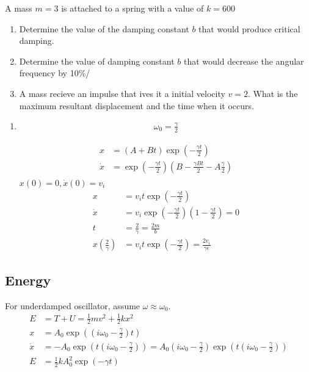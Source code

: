 \documentclass[a4paper]{article}
\numberwithin{equation}{section}
\begin{document}
\begin{example}
    A mass $m=3$ is attached to a spring with a value of $k=600$
    \begin{enumerate}
        \item Determine the value of the damping constant $b$ that would produce critical damping.
        \item Determine the value of damping constant $b$ that would decrease the angular frequency by 10\%/
        \item A mass recieve an impulse that ives it a initial velocity $v=2$. What is the maximum resultant displacement and the time when it occurs.
    \end{enumerate}
\end{example}
\begin{sol}
    \begin{enumerate}
        \item \begin{align}
            \omega_0=\frac{\gamma}{2}
        \end{align}

        \begin{align}
            x &= (A+Bt)\exp(-\frac{\gamma t}{2})\\
            \dot x&= \exp(-\frac{\gamma t}{2})\left(B-\frac{\gamma Bt}{2}-A\frac{\gamma}{2}\right)\\
        \end{align}
        $x(0)=0, \dot x(0)=v_i$
        \begin{align}
            x &=v_i t\exp(-\frac{\gamma t}{2})\\
            \dot x &= v_i\exp(-\frac{\gamma t}{2})\left(1-\frac{\gamma t}{2}\right) = 0\\
            t &= \frac{2}{\gamma}=\frac{2m}{b}\\
            x\left(\frac{2}{\gamma}\right)&=v_it\exp(-\frac{\gamma t}{2})=\frac{2v_i}{\gamma e}
        \end{align}
    \end{enumerate}
\end{sol}

\subsection{Energy}
For underdamped oscillator, assume $\omega\approx\omega_0$.
\begin{align}
    E&=T+U=\frac{1}{2}mv^2+\frac{1}{2}kx^2\\
    x&=A_0\exp((i\omega_0-\frac{\gamma}{2})t)\\
    \dot x&=-A_0\exp(t\left(i\omega_0-\frac{\gamma}{2}\right))=A_0\left(i\omega_0-\frac{\gamma}{2}\right)\exp(t\left(i\omega_0-\frac{\gamma}{2}\right))\\
    E&=\frac{1}{2}kA_0^2\exp(-\gamma t)\\
\end{align}
\end{document}
